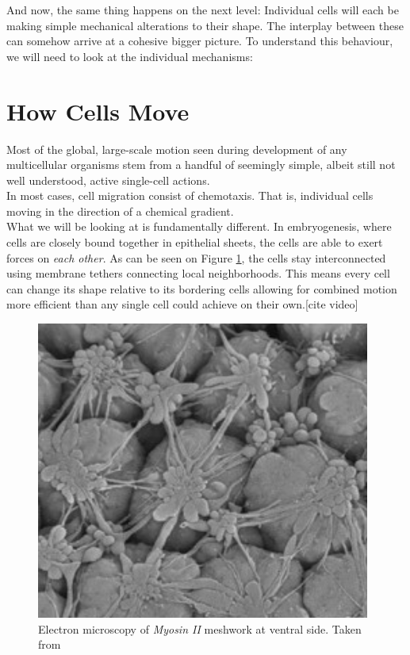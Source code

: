 And now, the same thing happens on the next level: Individual cells will each be making simple mechanical alterations to their shape. The interplay between these can somehow arrive at a cohesive bigger picture. To understand this behaviour, we will need to look at the individual mechanisms:

\section{How Cells Move}

Most of the global, large-scale motion seen during development of any multicellular organisms stem from a handful of seemingly simple, albeit still not well understood, active single-cell actions.\cite{walck2014cell}\\

In most cases, cell migration consist of chemotaxis. That is, individual cells moving in the direction of a chemical gradient.\\
What we will be looking at is fundamentally different. In embryogenesis, where cells are closely bound together in epithelial sheets, the cells are able to exert forces on \textit{each other}. As can be seen on Figure \ref{fig:mysosinMeshwork}, the cells stay interconnected using membrane tethers connecting local neighborhoods. This means every cell can change its shape relative to its bordering cells allowing for combined motion more efficient than any single cell could achieve on their own.[cite video] 


\begin{figure}[H]
    \centering
    \includegraphics[width=0.6\linewidth]{chapters/Theory/figures/EM_constricting_proteins.png}
    \caption{Electron microscopy of\textit{ Myosin II} meshwork at ventral side. Taken from }
    \label{fig:mysosinMeshwork}
\end{figure}






